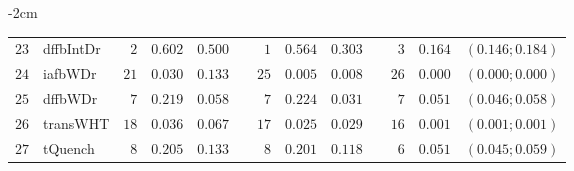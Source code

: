 \begin{table*}[!htbp]
\begin{adjustwidth*}{}{-2cm}
\begin{tabular}{@{}rlrrrrrrrrrcc@{}}
\footnotesize{$23$} & \footnotesize{dffbIntDr} & \footnotesize{$2 $} & \footnotesize{$0.602$} & \footnotesize{$0.500$} && \footnotesize{$1 $} & \footnotesize{$0.564$} & \footnotesize{$0.303$} && \footnotesize{$3 $} & \footnotesize{$0.164$} & \footnotesize{$(0.146;0.184)$} \\
\footnotesize{$24$} & \footnotesize{iafbWDr  } & \footnotesize{$21$} & \footnotesize{$0.030$} & \footnotesize{$0.133$} && \footnotesize{$25$} & \footnotesize{$0.005$} & \footnotesize{$0.008$} && \footnotesize{$26$} & \footnotesize{$0.000$} & \footnotesize{$(0.000;0.000)$} \\
\footnotesize{$25$} & \footnotesize{dffbWDr  } & \footnotesize{$7 $} & \footnotesize{$0.219$} & \footnotesize{$0.058$} && \footnotesize{$7 $} & \footnotesize{$0.224$} & \footnotesize{$0.031$} && \footnotesize{$7 $} & \footnotesize{$0.051$} & \footnotesize{$(0.046;0.058)$} \\
\footnotesize{$26$} & \footnotesize{transWHT } & \footnotesize{$18$} & \footnotesize{$0.036$} & \footnotesize{$0.067$} && \footnotesize{$17$} & \footnotesize{$0.025$} & \footnotesize{$0.029$} && \footnotesize{$16$} & \footnotesize{$0.001$} & \footnotesize{$(0.001;0.001)$} \\
\footnotesize{$27$} & \footnotesize{tQuench  } & \footnotesize{$8 $} & \footnotesize{$0.205$} & \footnotesize{$0.133$} && \footnotesize{$8 $} & \footnotesize{$0.201$} & \footnotesize{$0.118$} && \footnotesize{$6 $} & \footnotesize{$0.051$} & \footnotesize{$(0.045;0.059)$} \\
\bottomrule
\end{tabular}
\end{adjustwidth*}
\end{table*}

